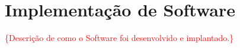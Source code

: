 \section{Implementação de Software}

\textcolor{red}{\{Descrição de como o Software foi desenvolvido e implantado.\}}
